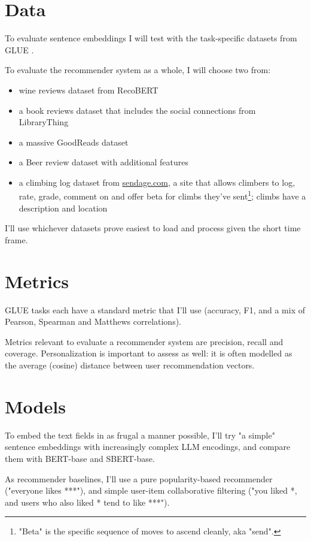 \documentclass[11pt]{article}
\begin{document}
\section{Data}

To evaluate sentence embeddings I will test with the task-specific datasets from GLUE \cite{GLUE}.

To evaluate the recommender system as a whole, I will choose two from: 
\begin{itemize}
  \item wine reviews dataset from RecoBERT \cite{Malkiel2020}
  \item a book reviews dataset that includes the social connections from LibraryThing \cite{LibraryThing}
  \item a massive GoodReads dataset \cite{GoodReads}
  \item a Beer review dataset with additional features \cite{Beer}
  \item a climbing log dataset from \href{https://www.sendage.com}{sendage.com}, a site that allows climbers to log, rate, grade, comment on and offer beta for climbs they've sent\footnote[1]{"Beta" is the specific sequence of moves to ascend cleanly, aka "send".}; climbs have a description and location
\end{itemize}
I'll use whichever datasets prove easiest to load and process given the short time frame.

\section{Metrics} 

GLUE tasks each have a standard metric that I'll use (accuracy, F1, and a mix of Pearson, Spearman and Matthews correlations). 

Metrics relevant to evaluate a recommender system are precision, recall and coverage. Personalization is important to assess as well: it is often modelled as the average (cosine) distance between user recommendation vectors.

\section{Models} 

To embed the text fields in as frugal a manner possible, I'll try "a simple" sentence embeddings with increasingly complex LLM encodings, and compare them with BERT-base and SBERT-base.

As recommender baselines, I'll use a pure popularity-based recommender ("everyone likes ***"), and simple user-item collaborative filtering ("you liked *, and users who also liked * tend to like ***"). 
\end{document}
